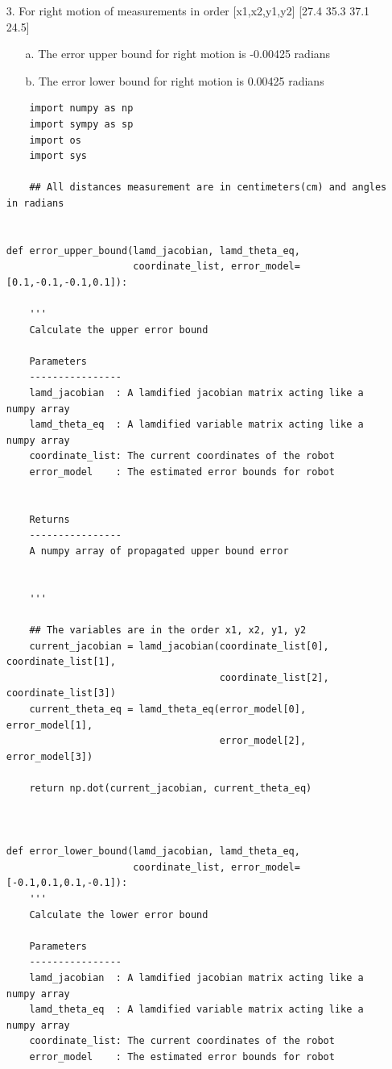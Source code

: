 {\begin{itemize}
        \item[3.] For right motion of measurements in order [x1,x2,y1,y2] [27.4 35.3 37.1 24.5]
        
        \begin{itemize}
            \item[a.] The error upper bound for right motion is -0.00425 radians 
            \item[b.] The error lower bound for right motion is 0.00425 radians
        \end{itemize}


            
        \begin{verbatim}
    import numpy as np
    import sympy as sp
    import os
    import sys
    
    ## All distances measurement are in centimeters(cm) and angles in radians 


def error_upper_bound(lamd_jacobian, lamd_theta_eq, 
                      coordinate_list, error_model=[0.1,-0.1,-0.1,0.1]):
    
    '''
    Calculate the upper error bound
    
    Parameters
    ----------------
    lamd_jacobian  : A lamdified jacobian matrix acting like a numpy array
    lamd_theta_eq  : A lamdified variable matrix acting like a numpy array
    coordinate_list: The current coordinates of the robot
    error_model    : The estimated error bounds for robot
    
    
    Returns
    ----------------
    A numpy array of propagated upper bound error
    
    
    '''
    
    ## The variables are in the order x1, x2, y1, y2
    current_jacobian = lamd_jacobian(coordinate_list[0], coordinate_list[1],
                                     coordinate_list[2], coordinate_list[3])
    current_theta_eq = lamd_theta_eq(error_model[0], error_model[1], 
                                     error_model[2], error_model[3])
    
    return np.dot(current_jacobian, current_theta_eq)
    


def error_lower_bound(lamd_jacobian, lamd_theta_eq, 
                      coordinate_list, error_model=[-0.1,0.1,0.1,-0.1]):
    '''
    Calculate the lower error bound
    
    Parameters
    ----------------
    lamd_jacobian  : A lamdified jacobian matrix acting like a numpy array
    lamd_theta_eq  : A lamdified variable matrix acting like a numpy array
    coordinate_list: The current coordinates of the robot
    error_model    : The estimated error bounds for robot
    

\end{verbatim}
\end{itemize}}

